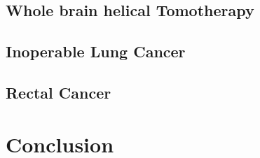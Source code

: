 \documentclass[10pt,journal,compsoc]{IEEEtran} %
\begin{document}
  \subsection{Whole brain helical Tomotherapy}
  \subsection{Inoperable Lung Cancer}
  \subsection{Rectal Cancer}
  \section{Conclusion}
  \label{conclusions}
  {}
  
  
\end{document}
